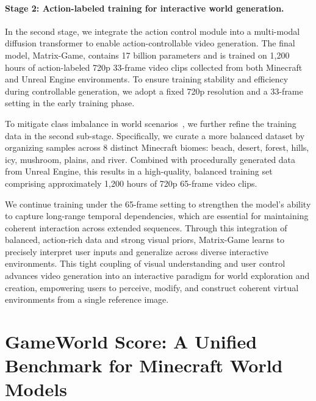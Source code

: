 \documentclass{article}
\begin{document}
 

\paragraph{Stage 2: Action-labeled training for interactive world generation.}
In the second stage, we integrate the action control module into a multi-modal diffusion transformer to enable action-controllable video generation. The final model, Matrix-Game, contains 17 billion parameters and is trained on 1,200 hours of action-labeled 720p 33-frame video clips collected from both Minecraft and Unreal Engine environments. To ensure training stability and efficiency during controllable generation, we adopt a fixed 720p resolution and a 33-frame setting in the early training phase.

To mitigate class imbalance in world scenarios~\cite{zhang2023deep,zhang2022self}, we further refine the training data in the second sub-stage. Specifically, we curate a more balanced dataset by organizing samples across 8 distinct Minecraft biomes: beach, desert, forest, hills, icy, mushroom, plains, and river. Combined with procedurally generated data from Unreal Engine, this results in a high-quality, balanced training set comprising approximately 1,200 hours of 720p 65-frame video clips.

We continue training under the 65-frame setting to strengthen the model’s ability to capture long-range temporal dependencies, which are essential for maintaining coherent interaction across extended sequences. Through this integration of balanced, action-rich data and strong visual priors, Matrix-Game learns to precisely interpret user inputs and generalize across diverse interactive environments. This tight coupling of visual understanding and user control advances video generation into an interactive paradigm for world exploration and creation, empowering users to perceive, modify, and construct coherent virtual environments from a single reference image.
 



\section{GameWorld Score: A Unified Benchmark for Minecraft World Models}
\label{sec:gameworld_benchmark}
\end{document}
